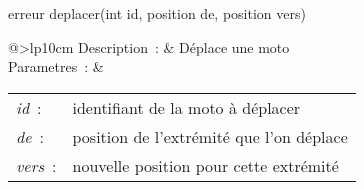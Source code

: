 \begin{minipage}{\linewidth}

\begin{lst-c++}
erreur deplacer(int id, position de, position vers)
\end{lst-c++}

\noindent
\begin{tabular}[t]{@{\extracolsep{0pt}}>{\bfseries}lp{10cm}}
Description~: & Déplace une moto \\


Parametres~: &
\begin{tabular}[t]{@{\extracolsep{0pt}}ll}
    
    
      
        \textsl{id}~: & identifiant de la moto à déplacer \\
      
    
      
        \textsl{de}~: & position de l'extrémité que l'on déplace \\
      
    
      
        \textsl{vers}~: & nouvelle position pour cette extrémité \\
      
    
  \end{tabular} \\






\end{tabular} \\[0.3cm]
\end{minipage}


